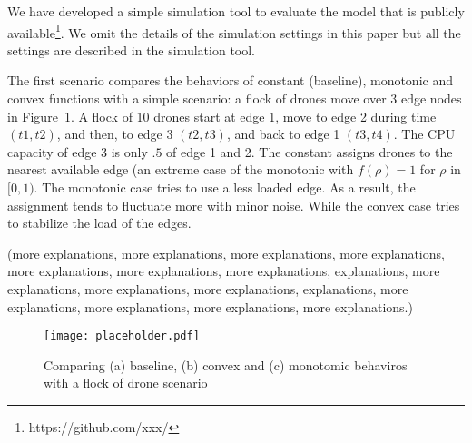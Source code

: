 
We have developed a simple simulation tool to evaluate the model
that is publicly available\footnote{https://github.com/xxx/}.
We omit the details of the simulation settings in this paper but all
the settings are described in the simulation tool.


The first scenario compares the behaviors of constant (baseline), monotonic and
convex functions with a simple scenario: a flock of drones move
over 3 edge nodes in Figure~\ref{fig:edge}.
A flock of 10 drones start at edge 1, move to edge 2 during time
$(t1, t2)$, and then, to edge 3 $(t2, t3)$, and back to edge 1 $(t3, t4)$.
The CPU capacity of edge 3 is only $.5$ of edge 1 and 2.
The constant assigns drones to the nearest available edge (an extreme
case of the monotonic with $f(\rho) = 1$ for $\rho$ in $[0,1)$.
The monotonic case tries to use a less loaded edge. As a result,
the assignment tends to fluctuate more with minor noise.
While the convex case tries to stabilize the load of the edges.

(more explanations, more explanations, more explanations, more
explanations, more explanations, more explanations, more explanations,
explanations, more explanations, more explanations, more explanations,
explanations, more explanations, more explanations, more explanations,
more explanations.)

\begin{figure}[tb]
  \begin{center}
    \texttt{[image: placeholder.pdf]}
    \vspace{-4.0ex}
    \caption{Comparing (a) baseline, (b) convex and (c) monotomic behaviros with
      a flock of drone scenario}
    \smallskip
    \raggedright
    \small
    \label{fig:edge}
  \end{center}
\end{figure}

